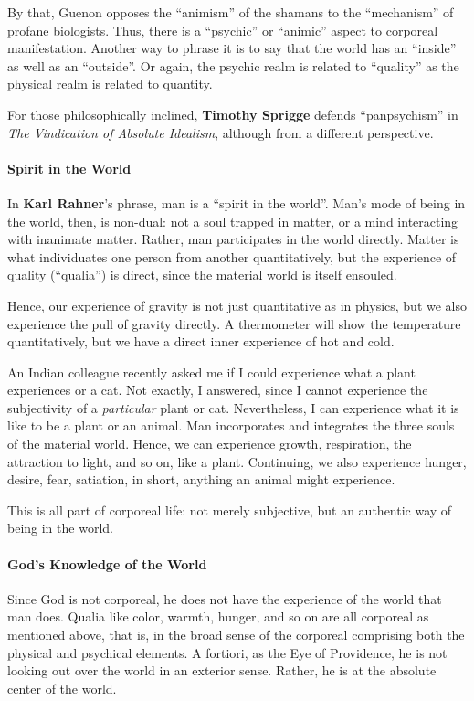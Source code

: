 By that, Guenon opposes the ``animism'' of the shamans to the ``mechanism'' of profane biologists. Thus, there is a ``psychic'' or ``animic'' aspect to corporeal manifestation. Another way to phrase it is to say that the world has an ``inside'' as well as an ``outside''. Or again, the psychic realm is related to ``quality'' as the physical realm is related to quantity.

For those philosophically inclined, \textbf{Timothy Sprigge} defends ``panpsychism'' in \emph{The Vindication of Absolute Idealism}, although from a different perspective.

\paragraph{Spirit in the World}


In \textbf{Karl Rahner}'s phrase, man is a ``spirit in the world''. Man's mode of being in the world, then, is non-dual: not a soul trapped in matter, or a mind interacting with inanimate matter. Rather, man participates in the world directly. Matter is what individuates one person from another quantitatively, but the experience of quality (``qualia'') is direct, since the material world is itself ensouled.

Hence, our experience of gravity is not just quantitative as in physics, but we also experience the pull of gravity directly. A thermometer will show the temperature quantitatively, but we have a direct inner experience of hot and cold.

An Indian colleague recently asked me if I could experience what a plant experiences or a cat. Not exactly, I answered, since I cannot experience the subjectivity of a \emph{particular} plant or cat. Nevertheless, I can experience what it is like to be a plant or an animal. Man incorporates and integrates the three souls of the material world. Hence, we can experience growth, respiration, the attraction to light, and so on, like a plant. Continuing, we also experience hunger, desire, fear, satiation, in short, anything an animal might experience.

This is all part of corporeal life: not merely subjective, but an authentic way of being in the world.

\paragraph{God's Knowledge of the World}


Since God is not corporeal, he does not have the experience of the world that man does. Qualia like color, warmth, hunger, and so on are all corporeal as mentioned above, that is, in the broad sense of the corporeal comprising both the physical and psychical elements. A fortiori, as the Eye of Providence, he is not looking out over the world in an exterior sense. Rather, he is at the absolute center of the world.

